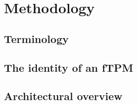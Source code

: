 
\chapter{Methodology}\label{chapter:methodology}

\section{Terminology}


\section{The identity of an fTPM}


\section{Architectural overview}






